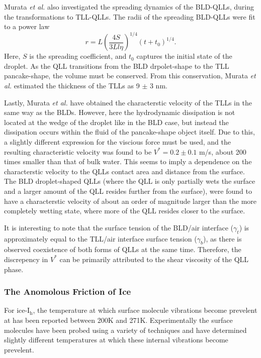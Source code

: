 Murata \textit{et al.} also investigated the spreading dynamics of the
BLD-QLLs, during the transformations to TLL-QLLs. The radii of the
spreading BLD-QLLs were fit to a power law
\begin{equation}
r = L (\frac{4S}{3Ll \eta})^{1/4}(t+t_0)^{1/4}.
\end{equation}
Here, $S$ is the spreading coefficient, and $t_0$ captures the initial
state of the droplet. As the QLL transitions from the BLD
drpolet-shape to the TLL pancake-shape, the volume must be
conserved. From this conservation, Murata \textit{et al.} estimated
the thickness of the TLLs as 9 $\pm$ 3 nm.

Lastly, Murata \textit{et al.} have obtained the characterstic
velocity of the TLLs in the same way as the BLDs. However, here the
hydrodynamic dissipation is not located at the wedge of the droplet
like in the BLD case, but instead the dissipation occurs within the
fluid of the pancake-shape object itself. Due to this, a slightly
different expression for the viscious force must be used, and the
resulting characteristic velocity was found to be $V^* = 0.2 \pm 0.1$
m/s, about 200 times smaller than that of bulk water. This seems to
imply a dependence on the characterstic velocity to the QLLs contact
area and distance from the surface. The BLD droplet-shaped QLLs (where
the QLL is only partially wets the surface and a larger amount of the
QLL resides further from the surface), were found to have a
characterstic velocity of about an order of magnitude larger than the
more completely wetting state, where more of the QLL resides closer to
the surface.

It is interesting to note that the surface tension of the BLD/air
interface ($\gamma_t$) is approximately equal to the TLL/air interface
surface tension ($\gamma_b$), as there is observed coexistence of both
forms of QLLs at the same time. Therefore, the discrepency in $V^*$
can be primarily attributed to the shear viscosity of the QLL phase.


\subsubsection{The Anomolous Friction of Ice}



For ice-I$_\mathrm{h}$, the temperature at which surface molecule
vibrations become prevelent at has been reported between 200K and
271K. Experimentally the surface molecules have been probed using a
variety of techniques and have determined slightly different
temperatures at which these internal vibrations become prevelent.

